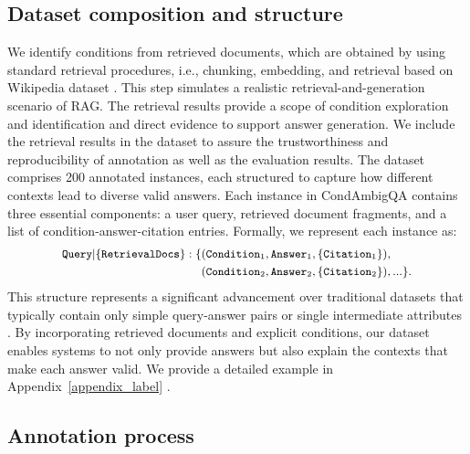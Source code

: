 \subsection{Dataset composition and structure}
We identify conditions from retrieved documents, which are obtained by using standard retrieval procedures, i.e., chunking, embedding, and retrieval based on Wikipedia dataset \cite{douze2024faiss}. This step simulates a realistic retrieval-and-generation scenario of RAG. The retrieval results provide a scope of condition exploration and identification and direct evidence to support answer generation. We include the retrieval results in the dataset to assure the trustworthiness and reproducibility of annotation as well as the evaluation results. The dataset comprises 200 annotated instances, each structured to capture how different contexts lead to diverse valid answers.
Each instance in CondAmbigQA contains three essential components: a user query, retrieved document fragments, and a list of condition-answer-citation entries. Formally, we represent each instance as:
\begin{equation}
\small
\begin{split}
        \texttt{Query} \vert \{\texttt{RetrievalDocs}\}: \{ &(\texttt{Condition}_1,\texttt{Answer}_1, \{\texttt{Citation}_1\}),\\&(\texttt{Condition}_2,\texttt{Answer}_2, \{\texttt{Citation}_2\}),...\}.
\end{split}
\end{equation}
This structure represents a significant advancement over traditional datasets that typically contain only simple query-answer pairs or single intermediate attributes \cite{lin-etal-2022-truthfulqa}. By incorporating retrieved documents and explicit conditions, our dataset enables systems to not only provide answers but also explain the contexts that make each answer valid. We provide a detailed example in Appendix~\ref{appendix_label} .

\subsection{Annotation process}

